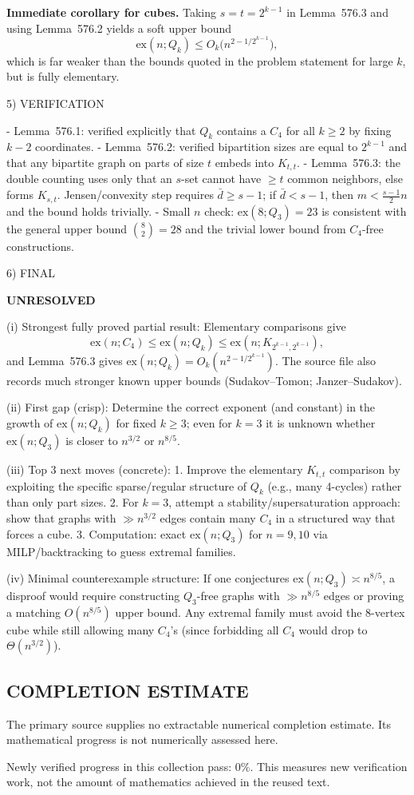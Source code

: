 \medskip
\textbf{Immediate corollary for cubes.}
Taking $s=t=2^{k-1}$ in Lemma~576.3 and using Lemma~576.2 yields a soft upper bound
\[
\mathrm{ex}(n;Q_k) \le O_k\big(n^{2-1/2^{k-1}}\big),
\]
which is far weaker than the bounds quoted in the problem statement for large $k$, but is fully elementary.

5) VERIFICATION

- Lemma~576.1: verified explicitly that $Q_k$ contains a $C_4$ for all $k\ge2$ by fixing $k-2$ coordinates.
- Lemma~576.2: verified bipartition sizes are equal to $2^{k-1}$ and that any bipartite graph on parts of size $t$ embeds into $K_{t,t}$.
- Lemma~576.3: the double counting uses only that an $s$-set cannot have $\ge t$ common neighbors, else forms $K_{s,t}$. Jensen/convexity step requires $\bar d\ge s-1$; if $\bar d<s-1$, then $m<\tfrac{s-1}{2}n$ and the bound holds trivially.
- Small $n$ check: $\mathrm{ex}(8;Q_3)=23$ is consistent with the general upper bound $\binom{8}{2}=28$ and the trivial lower bound from $C_4$-free constructions.

6) FINAL

\textbf{UNRESOLVED}

(i) Strongest fully proved partial result:  
Elementary comparisons give
\[\mathrm{ex}(n;C_4)\le \mathrm{ex}(n;Q_k)\le \mathrm{ex}(n;K_{2^{k-1},2^{k-1}}),\]
and Lemma~576.3 gives $\mathrm{ex}(n;Q_k)=O_k(n^{2-1/2^{k-1}})$. The source file also records much stronger known upper bounds (Sudakov--Tomon; Janzer--Sudakov).

(ii) First gap (crisp):  
Determine the correct exponent (and constant) in the growth of $\mathrm{ex}(n;Q_k)$ for fixed $k\ge 3$; even for $k=3$ it is unknown whether $\mathrm{ex}(n;Q_3)$ is closer to $n^{3/2}$ or $n^{8/5}$.

(iii) Top 3 next moves (concrete):
1. Improve the elementary $K_{t,t}$ comparison by exploiting the specific sparse/regular structure of $Q_k$ (e.g., many 4-cycles) rather than only part sizes.
2. For $k=3$, attempt a stability/supersaturation approach: show that graphs with $\gg n^{3/2}$ edges contain many $C_4$ in a structured way that forces a cube.
3. Computation: exact $\mathrm{ex}(n;Q_3)$ for $n=9,10$ via MILP/backtracking to guess extremal families.

(iv) Minimal counterexample structure:  
If one conjectures $\mathrm{ex}(n;Q_3)\asymp n^{8/5}$, a disproof would require constructing $Q_3$-free graphs with $\gg n^{8/5}$ edges or proving a matching $O(n^{8/5})$ upper bound. Any extremal family must avoid the 8-vertex cube while still allowing many $C_4$'s (since forbidding all $C_4$ would drop to $\Theta(n^{3/2})$).




\subsection*{COMPLETION ESTIMATE}
The primary source supplies no extractable numerical completion estimate. Its mathematical progress is not numerically assessed here.

Newly verified progress in this collection pass: $0\%$. This measures new verification work, not the amount of mathematics achieved in the reused text.
